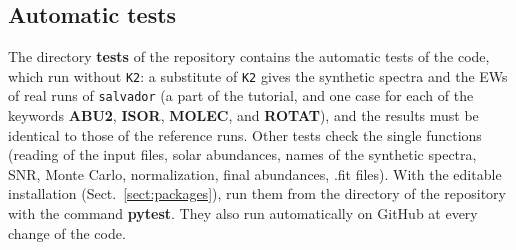 \documentclass[modern]{aastex701}
\begin{document}
\subsection{Automatic tests}
The directory {\bf tests} of the repository contains the automatic tests of the code, which run without \texttt{K2}: a substitute of \texttt{K2} gives the synthetic spectra and the EWs of real runs of \texttt{salvador} (a part of the tutorial, and one case for each of the keywords {\bf ABU2}, {\bf ISOR}, {\bf MOLEC}, and {\bf ROTAT}), and the results must be identical to those of the reference runs. Other tests check the single functions (reading of the input files, solar abundances, names of the synthetic spectra, SNR, Monte Carlo, normalization, final abundances, .fit files). With the editable installation (Sect.~\ref{sect:packages}), run them from the directory of the repository with the command {\bf pytest}. They also run automatically on GitHub at every change of the code.
\end{document}

